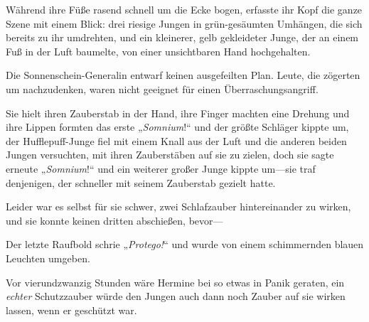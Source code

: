 Während ihre Füße rasend schnell um die Ecke bogen, erfasste ihr Kopf die ganze Szene mit einem Blick: drei riesige Jungen in grün-gesäumten Umhängen, die sich bereits zu ihr umdrehten, und ein kleinerer, gelb gekleideter Junge, der an einem Fuß in der Luft baumelte, von einer unsichtbaren Hand hochgehalten.

Die Sonnenschein-Generalin entwarf keinen ausgefeilten Plan. Leute, die zögerten um nachzudenken, waren nicht geeignet für einen Überraschungsangriff.

Sie hielt ihren Zauberstab in der Hand, ihre Finger machten eine Drehung und ihre Lippen formten das erste „\emph{Somnium}!“ und der größte Schläger kippte um, der Hufflepuff-Junge fiel mit einem Knall aus der Luft und die anderen beiden Jungen versuchten, mit ihren Zauberstäben auf sie zu zielen, doch sie sagte erneute „\emph{Somnium}!“ und ein weiterer großer Junge kippte um—sie traf denjenigen, der schneller mit seinem Zauberstab gezielt hatte.

Leider war es selbst für sie schwer, zwei Schlafzauber hintereinander zu wirken, und sie konnte keinen dritten abschießen, bevor—

Der letzte Raufbold schrie „\emph{Protego!}“ und wurde von einem schimmernden blauen Leuchten umgeben.

Vor vierundzwanzig Stunden wäre Hermine bei so etwas in Panik geraten, ein \emph{echter} Schutzzauber würde den Jungen auch dann noch Zauber auf sie wirken lassen, wenn er geschützt war.

